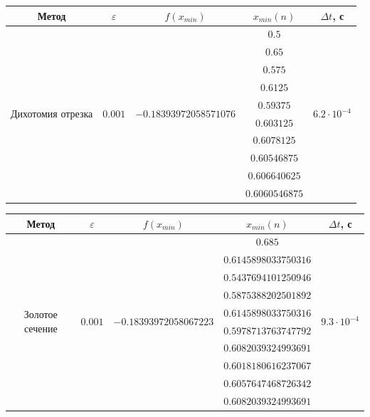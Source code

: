 \documentclass[a4paper,12pt]{extarticle}
\begin{document}
    \begin{center}
        \begin{tabular}{ |c|c|c|c|c| }
            \hline
            Метод & $\varepsilon$ & $f(x_{min})$ & $x_{min}(n)$ & $\Delta t$, с \\
            \hline
            \multirow{10}{9em}{\centerline{Дихотомия отрезка}} & \multirow{10}{5em}{\centerline{$0.001$}} 		  & \multirow{10}{10em}{\centerline{$-0.18393972058571076$}} &  		       $0.5$ & \multirow{10}{5em}{\centerline{$6.2\cdot10^{-4}$}} \\
            &  		  &  & $0.65$ &  \\
            &  		  &  & $0.575$ &  \\
            & 		  &  & $0.6125$ &  \\
            &  		  &  & $0.59375$ &  \\
            &  		  &  & $0.603125$ &  \\
            &  		  &  & $0.6078125$ &  \\
            & 		  &  & $0.60546875$ &  \\
            &  		  &  & $0.606640625$ &  \\
            &  		  &  & $0.6060546875$ &  \\
            \hline
        \end{tabular}
    \end{center}

    \begin{center}
        \begin{tabular}{ |c|c|c|c|c| }
            \hline
            Метод & $\varepsilon$ & $f(x_{min})$ & $x_{min}(n)$ & $\Delta t$, с \\
            \hline
            \multirow{10}{9em}{\centerline{Золотое сечение}} & \multirow{10}{5em}{\centerline{$0.001$}} 		  & \multirow{10}{10em}{\centerline{$-0.18393972058067223$}} &  		       $0.685$ & \multirow{10}{5em}{\centerline{$9.3\cdot10^{-4}$}} \\
            &  		  &  & $0.6145898033750316$ &  \\
            &  		  &  & $0.5437694101250946$ &  \\
            & 		  &  & $0.5875388202501892$ &  \\
            &  		  &  & $0.6145898033750316$ &  \\
            &  		  &  & $0.5978713763747792$ &  \\
            &  		  &  & $0.6082039324993691$ &  \\
            & 		  &  & $0.6018180616237067$ &  \\
            &  		  &  & $0.6057647468726342$ &  \\
            &  		  &  & $0.6082039324993691$ &  \\
            \hline
        \end{tabular}
    \end{center}
\end{document}
